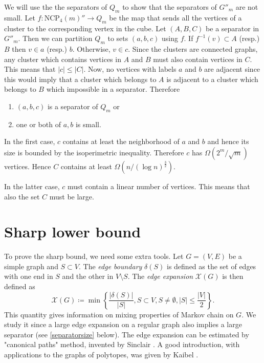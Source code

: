 \documentclass[a4paper,12pt]{book}
\theoremstyle{plain}
\theoremstyle{definition}
\newcommand\NC{\textrm{NCP}}
\begin{document}
We will use the the separators of $Q_m$ to show that the separators of $G''_m$ are not small.
Let $f: \NC_4(m)'' \rightarrow Q_m$ 
be the map that sends all the vertices of a cluster to the corresponding vertex 
in the cube. 
Let $(A,B,C)$ be a separator in $G''_m$. Then we can partition
$Q_m$ to sets $(a,b,c)$ using $f$. If $f^{-1}(v) \subset A$ (resp.) $B$ 
then 
$v \in a$ (resp.) $b$. Otherwise, $v \in c$. Since the clusters are connected 
graphs, any cluster which contains vertices in $A$ and $B$ must also contain 
vertices in $C$. This means that $|c| \leq |C|$.
Now, no vertices with labels $a$ and $b$ are adjacent since this would imply 
that a cluster which belongs to $A$ is adjacent to a cluster which belongs to 
$B$ which impossible in a separator. Therefore
\begin{enumerate}
 \item $(a,b,c)$ is a separator of $Q_m$ or
\item one or both of $a,b$ is small.
\end{enumerate}
In the first case, $c$ contains at least the neighborhood of $a$ and $b$ and 
hence its size is bounded by the isoperimetric inequality. Therefore $c$ has 
$\Omega(2^m/\sqrt{m})$ vertices. Hence $C$ contains at least $\Omega(n/(\log 
n)^{\frac{3}{2}})$.

In the latter case, $c$ must contain a linear number of vertices. This means 
that also the set $C$ must be large.  

\section{Sharp lower bound}

To prove the sharp bound, we need some extra tools. Let $G= (V,E)$ be a simple graph and
 $S\subset V$. The \textit{edge boundary} $\delta(S)$ is defined as the set of edges with one end
in $S$ and the other in $V\setminus S$. The \textit{edge expansion} $\mathcal{X}(G)$ is then defined
as 
\begin{equation}
\mathcal{X}(G) \coloneqq  \min \left\{ \frac{ |\delta(S) |}{ |S |}, S \subset V, S\neq \emptyset, |S| \leq \frac{ |V |}{2}  \right\}.
\end{equation} 
This quantity gives information on mixing properties of Markov chain on $G$. We study it since
a large edge expansion on a regular graph also implies a large separator (see \ref{separatorsize} below).
The edge expansion can be estimated by "canonical paths" method, invented by Sinclair \cite{Sinclair}. 
A good introduction, with applications to the graphs of polytopes, was given by Kaibel \cite{Kaibel}. 
\end{document}
